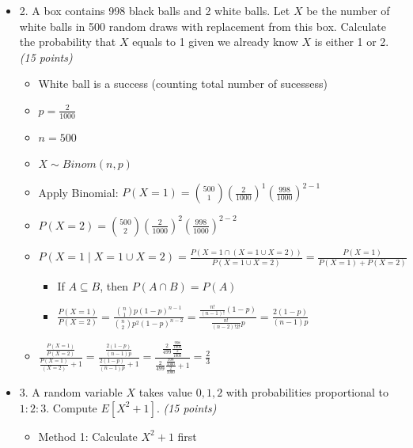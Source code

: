 \documentclass{article}
\begin{document}
\begin{itemize}
\begin{itemize}
    \end{itemize}
    \item 2. A box contains 998 black balls and 2 white balls. Let $X$ be the number of white balls in 500 random draws with replacement from this box. Calculate the probability that $X$ equals to 1 given we already know $X$ is either 1 or 2. \textit{(15 points)}
    \begin{itemize}
        \item White ball is a success (counting total number of sucessess)
        \item $p=\frac{2}{1000}$
        \item $n=500$
        \item $X \sim Binom(n,p)$
        \item Apply Binomial: $P(X=1) = \binom{500}{1} \left( \frac{2}{1000} \right)^1 \left( \frac{998}{1000} \right)^{2-1}$
        \item $P(X=2) = \binom{500}{2} \left( \frac{2}{1000} \right)^2 \left( \frac{998}{1000} \right)^{2-2}$
        \item $P(X=1 \mid X=1 \cup X=2) = \frac{P(X=1 \cap \left( X=1 \cup X=2 \right))}{P(X=1 \cup X=2)} = \frac{P(X=1)}{P(X=1)+P(X=2)}$
        \begin{itemize}
            \item If $A \subseteq B$, then $P(A \cap B) = P(A)$
        \end{itemize}
        \begin{itemize}
            \item $\frac{P(X=1)}{P(X=2)} = \frac{\binom{n}{1} p (1-p)^{n-1}}{\binom{n}{2} p^2 (1-p)^{n-2}}= \frac{\frac{n!}{(n-1)!} (1-p)}{\frac{n!}{(n-2)!2!} p} = \frac{2(1-p)}{(n-1)p}$
        \end{itemize}
        \item $\frac{\frac{P(X=1)}{P(X=2)}}{\frac{P(X=1)}{{(X=2)}} + 1} = \frac{\frac{2(1-p)}{(n-1)p}}{\frac{2(1-p)}{(n-1)p}+1} = \frac{\frac{2}{499}\frac{\frac{998}{1000}}{\frac{2}{1000}}}{\frac{2}{499}\frac{\frac{998}{1000}}{\frac{2}{1000}} + 1} = \frac{2}{3}$
    \end{itemize}
    \item 3. A random variable $X$ takes value $0,1,2$ with probabilities proportional to $1:2:3$. Compute $E[X^2+1]$. \textit{(15 points)}
    \begin{itemize}
        \item Method 1: Calculate $X^2+1$ first
\end{itemize}
\end{itemize}
\end{document}
